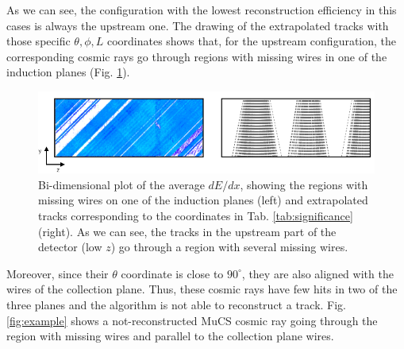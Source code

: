 \documentclass[a4paper]{scrartcl}
\begin{document}
As we can see, the configuration with the lowest reconstruction efficiency in this cases is always the upstream one. The drawing of the extrapolated tracks with those specific $\theta,\phi,L$ coordinates shows that, for the upstream configuration, the corresponding cosmic rays go through regions with missing wires in one of the induction planes (Fig. \ref{fig:wires}).

\begin{figure}[htbp]
  \begin{center}
    \includegraphics[width=1\linewidth]{figures/wire_tracks.png}
    \caption{Bi-dimensional plot of the average $dE/dx$, showing the regions with missing wires on one of the induction planes (left) and extrapolated tracks corresponding to the coordinates in Tab. \ref{tab:significance} (right). As we can see, the tracks in the upstream part of the detector (low $z$) go through a region with several missing wires.} \label{fig:wires}
  \end{center}
\end{figure}


Moreover, since their $\theta$ coordinate is close to $90^\circ$, they are also aligned with the wires of the collection plane. Thus, these cosmic rays have few hits in two of the three planes and the algorithm is not able to reconstruct a track. Fig. \ref{fig:example} shows a not-reconstructed MuCS cosmic ray going through the region with missing wires and parallel to the collection plane wires.
\end{document}
